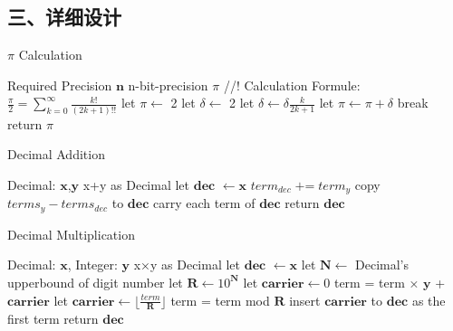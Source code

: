 \documentclass[UTF8, a4paper]{ctexart}
\begin{document}
\subsection*{三、详细设计}
\begin{algorithm}
\begin{algorithmic}[1]
\caption{$\pi$ Calculation}
\Require Required Precision $\mathbf{n}$
\Ensure  n-bit-precision $\pi$
\State //! Calculation Formule: $\frac{\pi}{2}=\sum_{k=0}^{\infty}\frac{k!}{(2k+1)!!}$
\State let $\pi\leftarrow$ 2
\State let $\delta\leftarrow$ 2
	\State let $\delta\leftarrow\delta\frac{k}{2k+1}$
	\State let $\pi\leftarrow\pi+\delta$
		\State break
	\EndIf
\EndFor
\State return $\pi$
\end{algorithmic}
\end{algorithm}

\begin{algorithm}[H]
\caption{Decimal Addition}
\begin{algorithmic}[1]
\Require Decimal: $\mathbf{x}$,$\mathbf{y}$
\Ensure  x+y as Decimal
\State let $\mathbf{dec}$ $\leftarrow\mathbf{x}$
	\State $term_{dec}\;\text{+=}\;term_y$
\EndFor
\State copy $terms_y-terms_{dec}$ to $\mathbf{dec}$
\State carry each term of $\mathbf{dec}$
\State return $\mathbf{dec}$
\end{algorithmic}
\end{algorithm}

\begin{algorithm}
\begin{algorithmic}[1]
\caption{Decimal Multiplication}
\Require Decimal: $\mathbf{x}$, Integer: $\mathbf{y}$
\Ensure  x×y as Decimal
\State let $\mathbf{dec}$ $\leftarrow\mathbf{x}$
\State let $\mathbf{N}\leftarrow$ Decimal's upperbound of digit number
\State let $\mathbf{R}\leftarrow{10^\mathbf{N}}$
\State let $\mathbf{carrier}\leftarrow{0}$
	\State term = term × $\mathbf{y}$ + $\mathbf{carrier}$
	\State let $\mathbf{carrier}\leftarrow\lfloor\frac{term}{\mathbf{R}}\rfloor$
	\State term = term mod $\mathbf{R}$
\EndFor
{}
	\State insert $\mathbf{carrier}$ to $\mathbf{dec}$ as the first term
\EndIf
\State return $\mathbf{dec}$
\end{algorithmic}
\end{algorithm}
\end{document}

